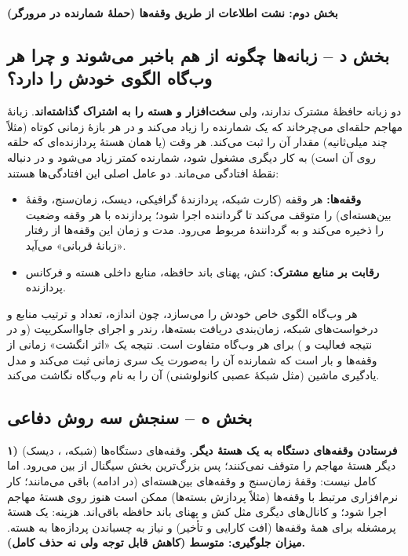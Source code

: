 \textbf{بخش دوم: نشت اطلاعات از طریق وقفه‌ها (حملهٔ شمارنده در مرورگر)}

\subsection*{بخش د – زبانه‌ها چگونه از هم باخبر می‌شوند و چرا هر وب‌گاه الگوی خودش را دارد؟}

دو زبانه حافظهٔ مشترک ندارند، ولی \textbf{سخت‌افزار و هسته را به اشتراک گذاشته‌اند}. زبانهٔ مهاجم حلقه‌ای می‌چرخاند که یک شمارنده را زیاد می‌کند و در هر بازهٔ زمانی کوتاه (مثلاً چند میلی‌ثانیه) مقدار آن را ثبت می‌کند. هر وقت  (یا همان هستهٔ پردازنده‌ای که حلقه روی آن است) به کار دیگری مشغول شود، شمارنده کمتر زیاد می‌شود و در دنباله نقطهٔ افتادگی می‌ماند. دو عامل اصلی این افتادگی‌ها هستند:
\begin{itemize}
  \item \textbf{وقفه‌ها:} هر وقفه (کارت شبکه، پردازندهٔ گرافیکی، دیسک، زمان‌سنج، وقفهٔ بین‌هسته‌ای)  را متوقف می‌کند تا گرداننده اجرا شود؛ پردازنده با هر وقفه وضعیت را ذخیره می‌کند و به گردانندهٔ مربوط می‌رود. مدت و زمان این وقفه‌ها از رفتار «زبانهٔ قربانی» می‌آید.
  \item \textbf{رقابت بر منابع مشترک:} کش، پهنای باند حافظه، منابع داخلی هسته و فرکانس پردازنده.
\end{itemize}

هر وب‌گاه الگوی خاص خودش را می‌سازد، چون اندازه، تعداد و ترتیب منابع و درخواست‌های شبکه، زمان‌بندی دریافت بسته‌ها، رندر و اجرای جاوااسکریپت (و در نتیجه فعالیت  و ) برای هر وب‌گاه متفاوت است. نتیجه یک «اثر انگشت» زمانی از وقفه‌ها و بار  است که شمارنده آن را به‌صورت یک سری زمانی ثبت می‌کند و مدل یادگیری ماشین (مثل شبکهٔ عصبی کانولوشنی) آن را به نام وب‌گاه نگاشت می‌کند.

\subsection*{بخش ه – سنجش سه روش دفاعی}

\textbf{۱) فرستادن وقفه‌های دستگاه به یک هستهٔ دیگر.} وقفه‌های دستگاه‌ها (شبکه، ، دیسک) دیگر هستهٔ مهاجم را متوقف نمی‌کنند؛ پس بزرگ‌ترین بخش سیگنال از بین می‌رود. اما کامل نیست: وقفهٔ زمان‌سنج و وقفه‌های بین‌هسته‌ای (در ادامه) باقی می‌مانند؛ کار نرم‌افزاری مرتبط با وقفه‌ها (مثلاً پردازش بسته‌ها) ممکن است هنوز روی هستهٔ مهاجم اجرا شود؛ و کانال‌های دیگری مثل کش و پهنای باند حافظه باقی‌اند. هزینه: یک هستهٔ پرمشغله برای همهٔ وقفه‌ها (افت کارایی و تأخیر) و نیاز به چسباندن پردازه‌ها به هسته. \textbf{میزان جلوگیری: متوسط (کاهش قابل توجه ولی نه حذف کامل).}

